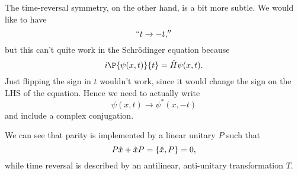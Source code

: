 The time-reversal symmetry, on the other hand, is a bit more subtle. We would like to have
\begin{equation}
    ``t \to -t,''
\end{equation}
but this can't quite work in the Schr\"odinger equation because
\begin{equation}
    i\P{\psi(x,t)}{t} = \hat H \psi(x,t).
\end{equation}
Just flipping the sign in $t$ wouldn't work, since it would change the sign on the LHS of the equation. Hence we need to actually write
\begin{equation}
    \psi(x,t) \to \psi^*(x,-t)
\end{equation}
and include a complex conjugation.

We can see that parity is implemented by a linear unitary $P$ such that
\begin{equation}
    P\hat x + \hat x P = \{\hat x,P\}=0,
\end{equation}
while time reversal is described by an antilinear, anti-unitary transformation $T$.